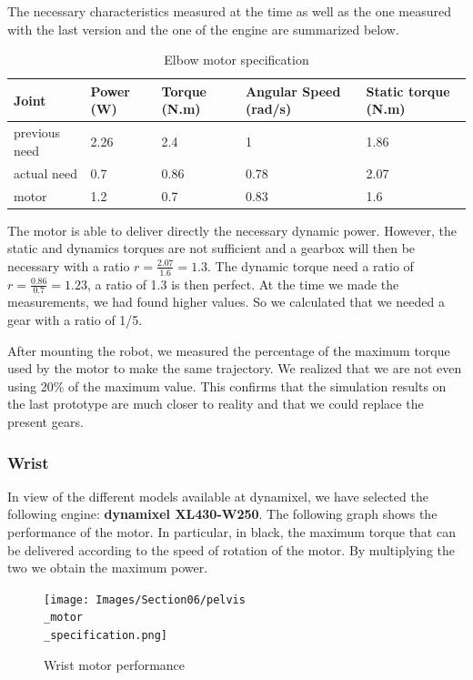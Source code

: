 \bigbreak
The necessary characteristics measured at the time as well as the one measured with the last version and the one of the engine are summarized below.
\begin{table}[ht]
    \centering
    \begin{tabular}{|p{1.5cm} | p{2cm} | p{2.5cm}| p{2.7cm} | p{2.7cm} |} 
        \hline
        \textbf{Joint}& \textbf{Power (W)} & \textbf{Torque (N.m)} & \textbf{Angular Speed (rad/s)} & \textbf{Static torque (N.m)}\\ [0.3ex]
        \hline
        previous need & 2.26 & 2.4 & 1 & 1.86 \\ 
        \hline
        actual need & 0.7 & 0.86 & 0.78 & 2.07 \\ 
        \hline
        motor & 1.2 & 0.7 & 0.83 & 1.6\\ 
        \hline
    \end{tabular}
    \caption{Elbow motor specification}
\end{table}
\FloatBarrier
The motor is able to deliver directly the necessary dynamic power. However, the static and dynamics torques are not sufficient and a gearbox will then be necessary with a ratio $r=\frac{2.07}{1.6}=1.3$. The dynamic torque need a ratio of $r=\frac{0.86}{0.7}=1.23$, a ratio of 1.3 is then perfect. At the time we made the measurements, we had found higher values. So we calculated that we needed a gear with a ratio of 1/5.

\bigbreak
After mounting the robot, we measured the percentage of the maximum torque used by the motor to make the same trajectory. We realized that we are not even using 20\% of the maximum value. This confirms that the simulation results on the last prototype are much closer to reality and that we could replace the present gears.

\subsubsection{Wrist}

In view of the different models available at dynamixel, we have selected the following engine: \textbf{dynamixel XL430-W250}. The following graph shows the performance of the motor. In particular, in black, the maximum torque that can be delivered according to the speed of rotation of the motor. By multiplying the two we obtain the maximum power.
\begin{figure}[ht]
    \centering
    \texttt{[image: Images/Section06/pelvis\\\_motor\\\_specification.png]}
    \caption{Wrist motor performance}
    \label{fig:WristMotor}
\end{figure}
\FloatBarrier

